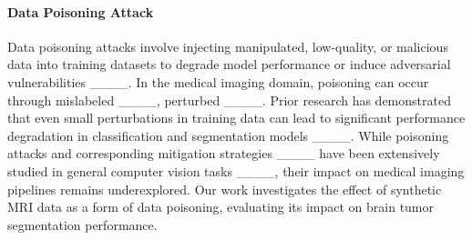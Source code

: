\paragraph{Data Poisoning Attack}  
Data poisoning attacks involve injecting manipulated, low-quality, or malicious data into training datasets to degrade model performance or induce adversarial vulnerabilities ____. In the medical imaging domain, poisoning can occur through mislabeled ____, perturbed ____. Prior research has demonstrated that even small perturbations in training data can lead to significant performance degradation in classification and segmentation models ____. While poisoning attacks and corresponding mitigation strategies ____ have been extensively studied in general computer vision tasks ____, their impact on medical imaging pipelines remains underexplored. Our work investigates the effect of synthetic MRI data as a form of data poisoning, evaluating its impact on brain tumor segmentation performance.